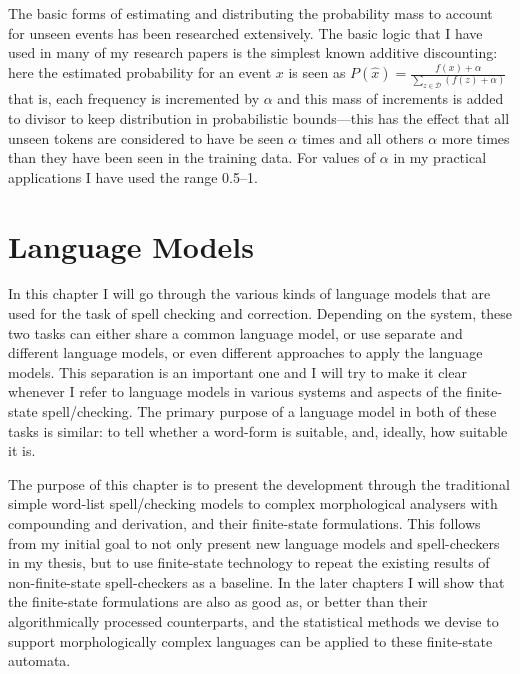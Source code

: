 \documentclass[officiallayout]{unihelcompling}
\begin{document}
The basic forms of estimating and distributing the probability mass to account
for unseen events has been researched extensively. The basic logic that I have
used in many of my research papers is the simplest known additive discounting:
here the estimated probability for an event $x$ is seen as $P(\hat{x}) =
\frac{f(x) + \alpha}{\sum_{z \in \mathcal{D}}(f(z) + \alpha)}$ that is, each
frequency is incremented by $\alpha$ and this mass of increments is added to
divisor to keep distribution in probabilistic bounds---this has the effect that
all unseen tokens are considered to have be seen $\alpha$ times and all others
$\alpha$ more times than they have been seen in the training data. For values
of $\alpha$ in my practical applications I have used the range 0.5--1.



\chapter{Language Models}
\label{chap:language-models}

In this chapter I will go through the various kinds of language models that are
used for the task of spell checking and correction.  Depending on the system,
these two tasks can either share a common language model, or use separate and
different language models, or even different approaches to apply the language
models. This separation is an important one and I will try to make it clear
whenever I refer to language models in various systems and aspects of the
finite-state spell\-/checking.  The primary purpose of a language model in
both of these tasks is similar: to tell whether a word-form is suitable, and,
ideally, how suitable it is.

The purpose of this chapter is to present the development through the
traditional simple word-list spell\-/checking models to complex morphological
analysers with compounding and derivation, and their finite-state formulations.
This follows from my initial goal to not only present new language models and
spell-checkers in my thesis, but to use finite-state technology to repeat the
existing results of non-finite-state spell-checkers as a baseline. In the later
chapters I will show that the finite-state formulations are also as good as, or
better than their algorithmically processed counterparts, and the statistical
methods we devise to support morphologically complex languages can be applied
to these finite-state automata.
\end{document}

